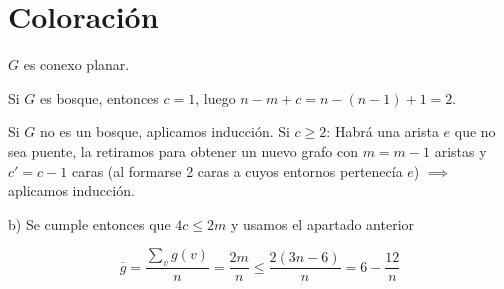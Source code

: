 \documentclass[openany]{book}
\begin{document}
\chapter{Coloración}


\begin{demonstration}
    $ G $ es conexo planar.
    
    Si $ G $ es bosque, entonces $ c = 1 $, luego $ n-m+c = n-(n-1)+1=2 $.
    
    Si $ G $ no es un bosque, aplicamos inducción. Si $ c\geq 2 $:
    Habrá una arista $ e $ que no sea puente, la retiramos para obtener un nuevo grafo con $ m = m-1 $ aristas y $ c' = c-1 $ caras (al formarse 2 caras a cuyos entornos pertenecía $ e $) $ \implies $ aplicamos inducción.

\end{demonstration}



    b) Se cumple entonces que $ 4c \leq 2m $ y usamos el apartado anterior %




\begin{demonstration}
    $$ \overline{g} = \dfrac{\sum\limits_{v}^{}g(v)}{n} = \dfrac{2m}{n} \leq \dfrac{2(3n-6)}{n} = 6-\dfrac{12}{n} $$
\end{demonstration}




\end{document}
